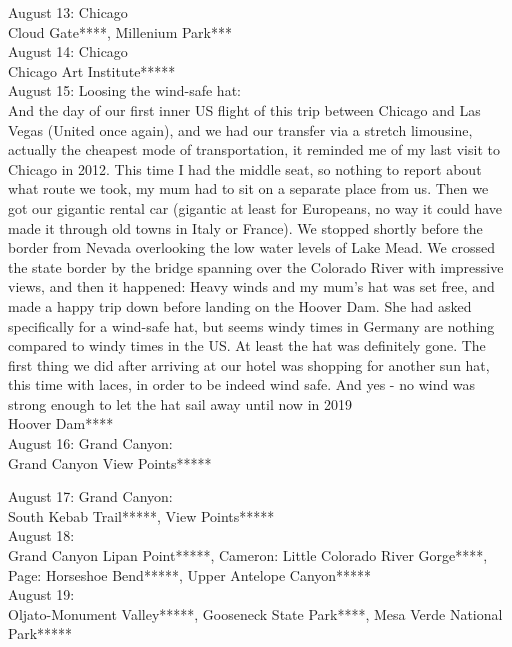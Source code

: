 August 13: Chicago\\
Cloud Gate****, Millenium Park***\\

August 14: Chicago\\
Chicago Art Institute*****\\

August 15: Loosing the wind-safe hat: \\
And the day of our first inner US flight of this trip between Chicago and Las Vegas (United once again), and we had our transfer via a stretch limousine, actually the cheapest mode of transportation, it reminded me of my last visit to Chicago in 2012. This time I had the middle seat, so nothing to report about what route we took, my mum had to sit on a separate place from us. Then we got our gigantic rental car (gigantic at least for Europeans, no way it could have made it through old towns in Italy or France). We stopped shortly before the border from Nevada overlooking the low water levels of Lake Mead. We crossed the state border by the bridge spanning over the Colorado River with impressive views, and then it happened: Heavy winds and my mum's hat was set free, and made a happy trip down before landing on the Hoover Dam. She had asked specifically for a wind-safe hat, but seems windy times in Germany are nothing compared to windy times in the US. At least the hat was definitely gone. The first thing we did after arriving at our hotel was shopping for another sun hat, this time with laces, in order to be indeed wind safe. And yes - no wind was strong enough to let the hat sail away until now in 2019\\

Hoover Dam****\\

August 16: Grand Canyon:\\
Grand Canyon View Points*****

August 17: Grand Canyon:\\
South Kebab Trail*****, View Points*****\\

August 18:\\
Grand Canyon Lipan Point*****, Cameron: Little Colorado River Gorge****, Page: Horseshoe Bend*****, Upper Antelope Canyon*****\\

August 19:\\
Oljato-Monument Valley*****, Gooseneck State Park****, Mesa Verde National Park*****\\

